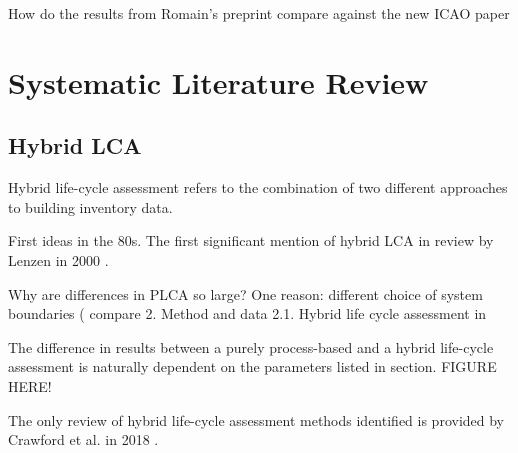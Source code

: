\documentclass{article}
\begin{document}
How do the results from Romain's preprint \cite{sacchi_climate-neutral_2022} compare against the new ICAO paper \cite{prussi_corsia_2021}

\newpage
\section{Systematic Literature Review}


    \subsection{Hybrid LCA}
        
        Hybrid life-cycle assessment refers to the combination of two different approaches to building inventory data. 
        
        First ideas in the 80s. The first significant mention of hybrid LCA in review by Lenzen in 2000 \cite{lenzen_errors_2000}.
            
        Why are differences in PLCA so large? One reason: different choice of system boundaries ( compare 2. Method and data 2.1. Hybrid life cycle assessment in \cite{teh_hybrid_2017}
        
        The difference in results between a purely process-based and a hybrid life-cycle assessment is naturally dependent on the parameters listed in section. FIGURE HERE!
        
        The only review of hybrid life-cycle assessment methods identified is provided by Crawford et al. in 2018 \cite{crawford_hybrid_2018}. \cite{}
        
\end{document}
